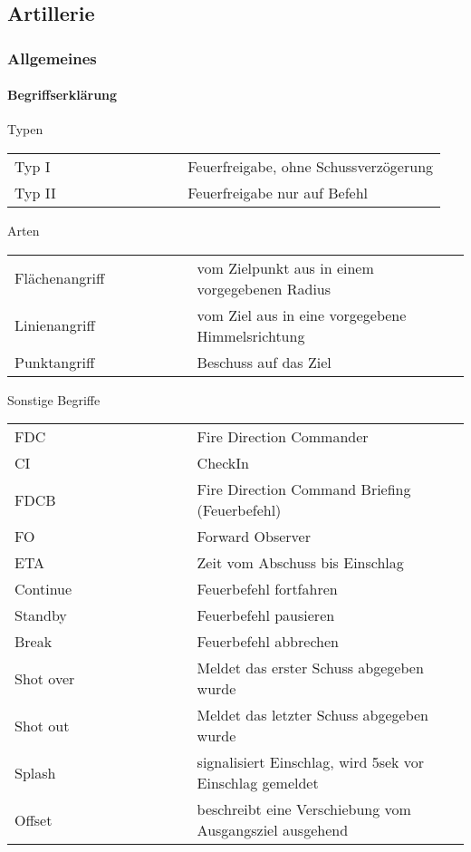 \newpage
\subsection{Artillerie}
\subsubsection{Allgemeines}
\paragraph{Begriffserklärung}
	Typen
	\begin{longtable}{p{0.4\linewidth} p{0.6\linewidth} }
		Typ I 		& 		Feuerfreigabe, ohne Schussverzögerung \\
		Typ II 		&		Feuerfreigabe nur auf Befehl \\
	\end{longtable}

	Arten
	\begin{longtable}{p{0.4\linewidth} p{0.6\linewidth} }
		Flächenangriff 	&	vom Zielpunkt aus in einem vorgegebenen Radius \\
		Linienangriff 		&	vom Ziel aus in eine vorgegebene Himmelsrichtung \\
		Punktangriff 		&	Beschuss auf das Ziel \\
	\end{longtable}

	Sonstige Begriffe

	\begin{longtable}{p{0.4\linewidth} p{0.6\linewidth} }
		FDC 		&		Fire Direction Commander \\
		CI  		&		CheckIn \\
		FDCB 		&		Fire Direction Command Briefing (Feuerbefehl) \\
		FO  		&		Forward Observer \\
		ETA  		&		Zeit vom Abschuss bis Einschlag \\
		Continue 	&		Feuerbefehl fortfahren \\
		Standby 	&		Feuerbefehl pausieren \\
		Break  	&		Feuerbefehl abbrechen \\
		Shot over  	&		Meldet das erster Schuss abgegeben wurde \\
		Shot out  	&		Meldet das letzter Schuss abgegeben wurde \\
		Splash  	&		signalisiert Einschlag, wird 5sek vor Einschlag gemeldet \\
		Offset  	&		beschreibt eine Verschiebung vom Ausgangsziel ausgehend \\
	\end{longtable}

